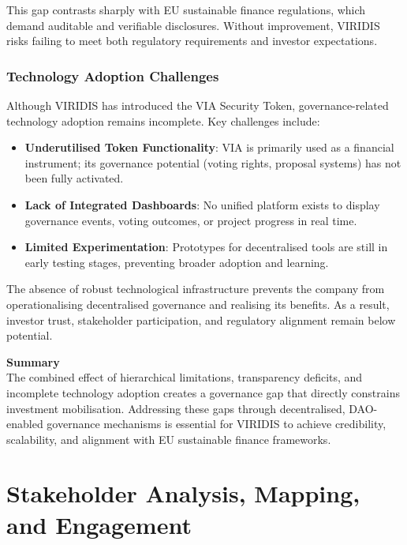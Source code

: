 \documentclass[
  english,
  12pt,
  oneside,
  open=any]{scrbook}
\providecommand{\tightlist}{%
  \setlength{\itemsep}{0pt}\setlength{\parskip}{0pt}}\usepackage{longtable,booktabs,array}
\begin{document}
This gap contrasts sharply with EU sustainable finance regulations,
which demand auditable and verifiable disclosures. Without improvement,
VIRIDIS risks failing to meet both regulatory requirements and investor
expectations.

\subsection{Technology Adoption Challenges}\label{sec-tech-chal}

Although VIRIDIS has introduced the VIA Security Token,
governance-related technology adoption remains incomplete. Key
challenges include:

\begin{itemize}
\tightlist
\item
  \textbf{Underutilised Token Functionality}: VIA is primarily used as a
  financial instrument; its governance potential (voting rights,
  proposal systems) has not been fully activated.\\
\item
  \textbf{Lack of Integrated Dashboards}: No unified platform exists to
  display governance events, voting outcomes, or project progress in
  real time.\\
\item
  \textbf{Limited Experimentation}: Prototypes for decentralised tools
  are still in early testing stages, preventing broader adoption and
  learning.
\end{itemize}

The absence of robust technological infrastructure prevents the company
from operationalising decentralised governance and realising its
benefits. As a result, investor trust, stakeholder participation, and
regulatory alignment remain below potential.

\textbf{Summary}\\
The combined effect of hierarchical limitations, transparency deficits,
and incomplete technology adoption creates a governance gap that
directly constrains investment mobilisation. Addressing these gaps
through decentralised, DAO-enabled governance mechanisms is essential
for VIRIDIS to achieve credibility, scalability, and alignment with EU
sustainable finance frameworks.

\chapter{Stakeholder Analysis, Mapping, and
Engagement}\label{sec-engagement}
\end{document}
